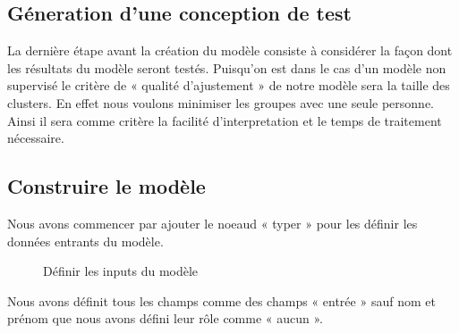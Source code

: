 \documentclass{article}
\begin{document}
            \subsection{Géneration d’une conception de test}
            La dernière étape avant la création du modèle consiste à considérer la façon dont les résultats du modèle seront testés. Puisqu’on est dans le cas d’un modèle non supervisé le critère de « qualité d’ajustement » de notre modèle sera la taille des clusters. En effet nous voulons minimiser les groupes avec une seule personne. Ainsi il sera comme critère la facilité d’interpretation et le temps de traitement nécessaire.
            \subsection{Construire le modèle}
            Nous avons commencer par ajouter le noeaud « typer » pour les définir les données entrants du modèle.
            \begin{figure}[h!]
                \centering
                \caption{Définir les inputs du modèle}
                \label{fig:19}
            \end{figure}    
            \newpage Nous avons définit tous les champs comme des champs « entrée » sauf nom et prénom que nous avons défini leur rôle comme « aucun ».
\end{document}
